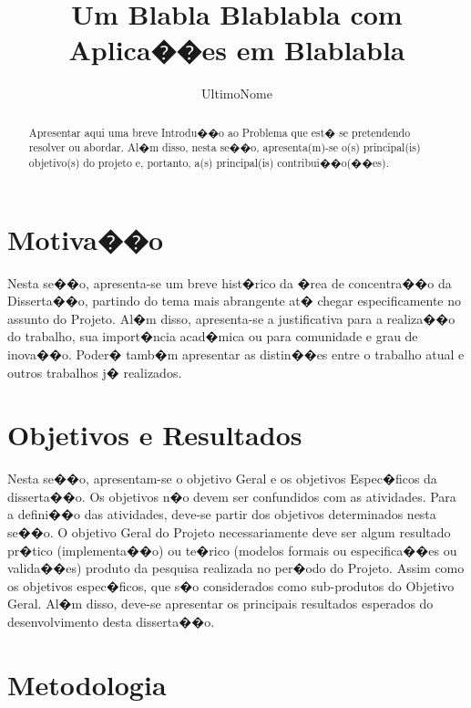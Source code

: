 \documentclass[diss-proposta,nocipinfo]{texufpel}
\title{Um Blabla Blablabla com Aplica��es em Blablabla}
\author{UltimoNome}{Nome Sobrenome de}
\begin{document}

\maketitle 
\sloppy

\begin{abstract}
  Apresentar aqui uma breve Introdu��o ao Problema que est� se
  pretendendo resolver ou abordar. Al�m disso, nesta se��o,
  apresenta(m)-se o(s) principal(is) objetivo(s) do projeto e,
  portanto, a(s) principal(is) contribui��o(��es).
\end{abstract}

\chapter{Motiva��o}

Nesta se��o, apresenta-se um breve hist�rico da �rea de concentra��o
da Disserta��o, partindo do tema mais abrangente at� chegar
especificamente no assunto do Projeto. Al�m disso, apresenta-se a
justificativa para a realiza��o do trabalho, sua import�ncia acad�mica
ou para comunidade e grau de inova��o. Poder� tamb�m apresentar as
distin��es entre o trabalho atual e outros trabalhos j� realizados.

\chapter{Objetivos e Resultados}

Nesta se��o, apresentam-se o objetivo Geral e os objetivos Espec�ficos
da disserta��o. Os objetivos n�o devem ser confundidos com as
atividades. Para a defini��o das atividades, deve-se partir dos
objetivos determinados nesta se��o. O objetivo Geral do Projeto
necessariamente deve ser algum resultado pr�tico (implementa��o) ou
te�rico (modelos formais ou especifica��es ou valida��es) produto da
pesquisa realizada no per�odo do Projeto. Assim como os objetivos
espec�ficos, que s�o considerados como sub-produtos do Objetivo
Geral. Al�m disso, deve-se apresentar os principais resultados
esperados do desenvolvimento desta disserta��o.

\chapter{Metodologia}
\end{document}
